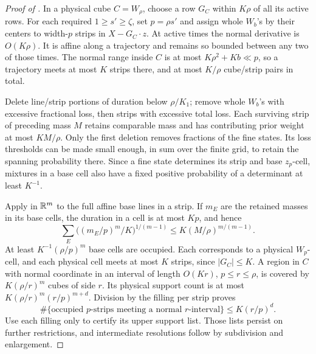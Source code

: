 \begin{proof}[Proof of ]
In a physical cube \(C=W_\rho\), choose a row \(G_C\) within
\(K\rho\) of all its active rows. For each required
\(1\geq s'\geq\zeta\), set \(p=\rho s'\) and assign whole
\(W_b\)'s by their centers to width-\(p\) strips in
\(X-G_C\cdot z\).
At active times the normal derivative is \(O(K\rho)\).
It is affine along a trajectory and remains so bounded between
any two of those times. The normal range inside \(C\) is at most
\(K\rho^2+Kb\ll p\), so a trajectory meets at most \(K\) strips
there, and at most \(K/\rho\) cube/strip pairs in total.

Delete line/strip portions of duration below \(\rho/K_1\);
remove whole \(W_b\)'s with excessive fractional loss, then
strips with excessive total loss. Each surviving strip of
preceding mass \(M\) retains comparable mass and has contributing
prior weight at most \(KM/\rho\).
Only the first deletion removes fractions of the fine states.
Its loss thresholds can be made small enough, in sum over the
finite grid, to retain the spanning probability there. Since a
fine state determines its strip and base \(z_p\)-cell, mixtures
in a base cell also have a fixed positive probability of a
determinant at least \(K^{-1}\).

Apply  in \(\mathbb R^m\) to the full affine
base lines in a strip. If \(m_E\) are the retained masses in its
base cells, the duration in a cell is at most \(Kp\), and hence
\[
 \sum_E\big((m_E/p)^m/K\big)^{1/(m-1)}
       \leq K(M/\rho)^{m/(m-1)}.
\]
At least \(K^{-1}(\rho/p)^m\) base cells are occupied.
Each corresponds to a physical \(W_p\)-cell, and each physical
cell meets at most \(K\) strips, since \(|G_C|\leq K\).
A region in \(C\) with normal coordinate in an interval of
length \(O(Kr)\), \(p\leq r\leq\rho\), is covered by
\(K(\rho/r)^m\) cubes of side \(r\).
Its physical support count is at most
\(K(\rho/r)^m(r/p)^{m+d}\).
Division by the filling per strip proves
\begin{equation}\label{a05:strip-count}
 \#\{\text{occupied }p\text{-strips meeting a normal }r
                   \text{-interval}\}\leq K(r/p)^d.
\end{equation}
Use each filling only to certify its upper support list.
Those lists persist on further restrictions, and intermediate
resolutions follow by subdivision and enlargement.


\end{proof}
